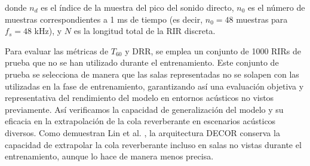 donde $n_d$ es el índice de la muestra del pico del sonido directo, $n_0$ es el número de muestras correspondientes a 1 ms de tiempo (es decir, $n_0 = 48$ muestras para $f_s = 48$ kHz), y $N$ es la longitud total de la RIR discreta. 

Para evaluar las métricas de $T_{60}$ y DRR, se emplea un conjunto de 1000 RIRs de prueba que no se han utilizado durante el entrenamiento. Este conjunto de prueba se selecciona de manera que las salas representadas no se solapen con las utilizadas en la fase de entrenamiento, garantizando así una evaluación objetiva y representativa del rendimiento del modelo en entornos acústicos no vistos previamente. Así verificamos la capacidad de generalización del modelo y su eficacia en la extrapolación de la cola reverberante en escenarios acústicos diversos. Como demuestran Lin et al. \cite{Lin25}, la arquitectura DECOR conserva la capacidad de extrapolar la cola reverberante incluso en salas no vistas durante el entrenamiento, aunque lo hace de manera menos precisa.